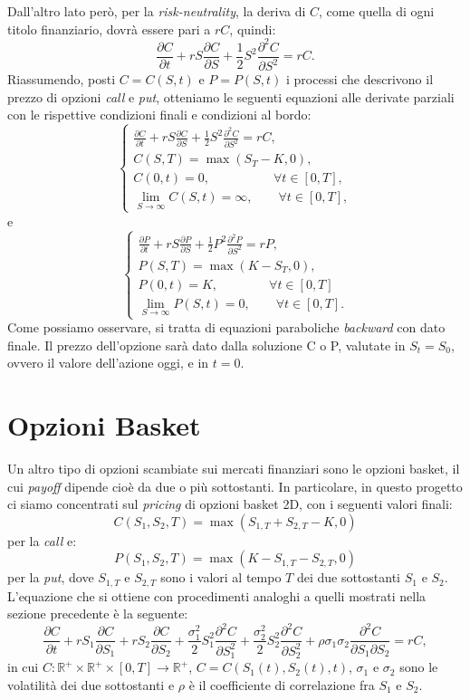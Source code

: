 \documentclass[a4paper,10pt]{report}
\newcommand{\der}[2]{\frac{\partial #1}{\partial #2}}
\newcommand{\dder}[2]{\frac{\partial^2 #1}{\partial #2^2}}
\newcommand{\dmix}[3]{\frac{\partial^2 #1}{\partial #2 \partial #3}}
\theoremstyle{plain}
\theoremstyle{definition}
\theoremstyle{remark}
\begin{document}
Dall'altro lato per\`o, per la \emph{risk-neutrality}, la deriva di $C$, come quella di ogni titolo finanziario, dovr\`a essere pari a $rC$, quindi:$$\der{C}{t}+r S \der{C}{S} +\frac{1}{2}S^2\dder{C}{S}=rC.$$
Riassumendo, posti $C=C(S,t)$ e $P=P(S,t)$ i processi che descrivono il prezzo di opzioni \emph{call} e \emph{put}, otteniamo le seguenti equazioni alle derivate parziali con le rispettive condizioni finali e condizioni al bordo:
\begin{equation}
\begin{cases}
\displaystyle
\der{C}{t}+r S \der{C}{S} +\frac{1}{2}S^2\dder{C}{S}=rC,\\
C(S,T)=\max(S_T-K,0),\\
C(0,t)=0,\qquad\quad\qquad\forall t\in[0,T],\\
\lim\limits_{S\to\infty}C(S,t)=\infty,\qquad\forall t\in[0,T],
\end{cases}
\label{callbs1d}
\end{equation}
e
\begin{equation}
\begin{cases}
\displaystyle
\der{P}{t}+r S \der{P}{S} +\frac{1}{2}P^2\dder{P}{S}=rP,\\
P(S,T)=\max(K-S_T,0),\\
P(0,t)=K,\qquad\qquad\forall t\in[0,T]\\
\lim\limits_{S\to\infty}P(S,t)=0,\qquad\forall t\in[0,T].
\end{cases}
\label{putbs1d}
\end{equation}
Come possiamo osservare, si tratta di equazioni paraboliche \emph{backward} con dato finale. Il prezzo dell'opzione sar\`a dato dalla soluzione C o P, valutate in $S_t=S_0$, ovvero il valore dell'azione oggi, e in $t=0$.

\section{Opzioni Basket}
Un altro tipo di opzioni scambiate sui mercati finanziari sono le opzioni basket, il cui \emph{payoff} dipende cio\`e da due o pi\`u sottostanti. In particolare, in questo progetto ci siamo concentrati sul \emph{pricing} di opzioni basket 2D, con i seguenti valori finali: $$C(S_1, S_2, T)=\max(S_{1,T}+S_{2,T}-K,0)$$ per la \emph{call} e: $$P(S_1, S_2, T)=\max(K-S_{1,T}-S_{2,T},0)$$ per la \emph{put}, dove $S_{1,T}$ e $S_{2,T}$ sono i valori al tempo $T$ dei due sottostanti $S_1$ e $S_2$.\\L'equazione che si ottiene con procedimenti analoghi a quelli mostrati nella sezione precedente \`e la seguente:
\begin{equation}
\der{C}{t}+rS_1\der{C}{S_1}+rS_2\der{C}{S_2}+\frac{\sigma^2_1}{2}S_1^2\dder{C}{S_1}+\frac{\sigma^2_2}{2}S_2^2\dder{C}{S_2}+\rho\sigma_1\sigma_2\dmix{C}{S_1}{S_2}=rC,
\label{pde2d}
\end{equation}
in cui $C:\mathbb{R}^+\times\mathbb{R}^+\times[0,T]\rightarrow\mathbb{R}^+$, $C=C(S_1(t), S_2(t),t)$, $\sigma_1$ e $\sigma_2$ sono le volatilit\`a dei due sottostanti e $\rho$ \`e il coefficiente di correlazione fra $S_1$ e $S_2$.
\end{document}
